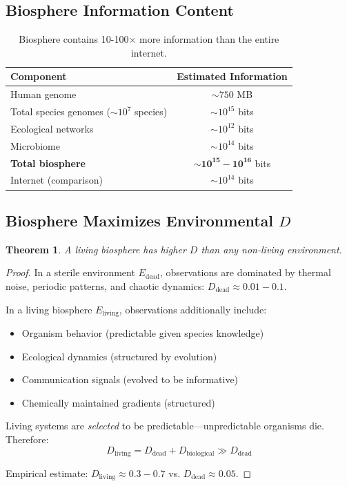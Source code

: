 \documentclass{article}
\newtheorem{theorem}{Theorem}[section]
\begin{document}
\subsection{Biosphere Information Content}

\begin{table}[h]
\centering
\begin{tabular}{@{}lc@{}}
\toprule
Component & Estimated Information \\
\midrule
Human genome & $\sim 750$ MB \\
Total species genomes ($\sim 10^7$ species) & $\sim 10^{15}$ bits \\
Ecological networks & $\sim 10^{12}$ bits \\
Microbiome & $\sim 10^{14}$ bits \\
\textbf{Total biosphere} & $\mathbf{\sim 10^{15} - 10^{16}}$ bits \\
\midrule
Internet (comparison) & $\sim 10^{14}$ bits \\
\bottomrule
\end{tabular}
\caption{Biosphere contains 10-100$\times$ more information than the entire internet.}
\end{table}

\subsection{Biosphere Maximizes Environmental $D$}

\begin{theorem}
A living biosphere has higher $D$ than any non-living environment.
\end{theorem}

\begin{proof}
In a sterile environment $E_{\text{dead}}$, observations are dominated by thermal noise, periodic patterns, and chaotic dynamics: $D_{\text{dead}} \approx 0.01 - 0.1$.

In a living biosphere $E_{\text{living}}$, observations additionally include:
\begin{itemize}
    \item Organism behavior (predictable given species knowledge)
    \item Ecological dynamics (structured by evolution)
    \item Communication signals (evolved to be informative)
    \item Chemically maintained gradients (structured)
\end{itemize}

Living systems are \textit{selected} to be predictable---unpredictable organisms die. Therefore:
\begin{equation}
D_{\text{living}} = D_{\text{dead}} + D_{\text{biological}} \gg D_{\text{dead}}
\end{equation}

Empirical estimate: $D_{\text{living}} \approx 0.3 - 0.7$ vs. $D_{\text{dead}} \approx 0.05$.
\end{proof}
\end{document}
